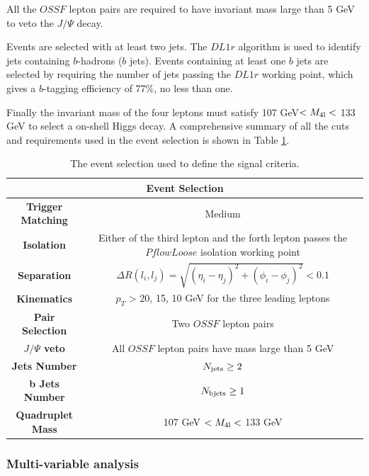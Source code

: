 All the $OSSF$ lepton pairs are required to have invariant mass large than 5 GeV to veto the $J/\Psi$ decay.

Events are selected with at least two jets. The $DL1r$ algorithm is used to identify jets containing $b$-hadrons ($b$ jets). Events containing at least one $b$ jets are selected by requiring the number of jets passing the $DL1r$ working point, which gives a $b$-tagging efficiency of 77\%, no less than one.

Finally the invariant mass of the four leptons must satisfy 107 GeV$<M_{\rm 4l}<$ 133 GeV to select a on-shell Higgs decay. A comprehensive summary of all the cuts and requirements used in the event selection is shown in Table \ref{Tab.pre-selection}.

\begin{table}[H]
\begin{center}
\caption{The event selection used to define the signal criteria.}
\label{Tab.pre-selection}
\begin{tabular}{cc}
	\toprule
	\toprule	
	\multicolumn{2}{c}{\textbf{Event Selection}}\\
	\midrule
	\textbf{Trigger Matching}&Medium\\
	\midrule
	\textbf{Isolation}&\makecell[c]{Either of the third lepton and the forth lepton\\ passes the $PflowLoose$ isolation working point}\\
	\midrule
	\textbf{Separation}&$\Delta{R}(l_{i},l_{j})=\sqrt{(\eta_{i}-\eta_{j})^{2}+(\phi_{i}-\phi_{j})^{2}}<0.1$\\
	\midrule
	\textbf{Kinematics}&$p_{T}$ > 20, 15, 10 GeV for the three leading leptons\\
	\midrule
	\textbf{Pair Selection}&Two $OSSF$ lepton pairs\\
	\midrule
	\textbf{$J/\Psi$ veto}&All $OSSF$ lepton pairs have mass large than 5 GeV\\
	\midrule
	\textbf{Jets Number}&$N_{\rm jets}\ge{2}$\\
	\midrule
	\textbf{b Jets Number}&$N_{\rm b jets}\ge{1}$\\
	\midrule
	\textbf{Quadruplet Mass}&107 GeV $<M_{\rm 4l}<$ 133 GeV\\
	\bottomrule
	\bottomrule
\end{tabular}
\end{center}
\end{table}

\subsubsection{Multi-variable analysis}
\label{subsubsec:mva}

